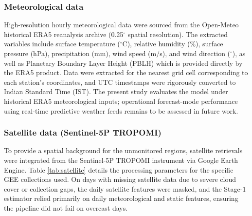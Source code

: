 \subsubsection{Meteorological data}
High-resolution hourly meteorological data were sourced from the Open-Meteo historical ERA5 reanalysis archive (0.25$^\circ$ spatial resolution). The extracted variables include surface temperature ($^\circ$C), relative humidity (\%), surface pressure (hPa), precipitation (mm), wind speed (m/s), and wind direction ($^\circ$), as well as Planetary Boundary Layer Height (PBLH) which is provided directly by the ERA5 product. Data were extracted for the nearest grid cell corresponding to each station's coordinates, and UTC timestamps were rigorously converted to Indian Standard Time (IST). The present study evaluates the model under historical ERA5 meteorological inputs; operational forecast-mode performance using real-time predictive weather feeds remains to be assessed in future work.

\subsubsection{Satellite data (Sentinel-5P TROPOMI)}
To provide a spatial background for the unmonitored regions, satellite retrievals were integrated from the Sentinel-5P TROPOMI instrument via Google Earth Engine. Table \ref{tab:satellite} details the processing parameters for the specific GEE collections used. On days with missing satellite data due to severe cloud cover or collection gaps, the daily satellite features were masked, and the Stage-1 estimator relied primarily on daily meteorological and static features, ensuring the pipeline did not fail on overcast days.

\begin{table}[h]
\centering
\caption{Sentinel-5P TROPOMI data extraction and processing parameters.}
\label{tab:satellite}
\end{table}

